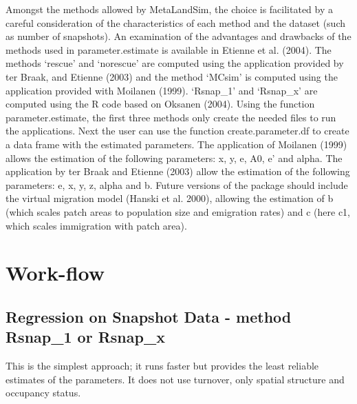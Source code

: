 \documentclass{article}\usepackage[]{graphicx}\usepackage[]{xcolor}
\begin{document}
Amongst the methods allowed by MetaLandSim, the choice is facilitated by a careful consideration of the characteristics of each method and the dataset (such as number of snapshots). An examination of the advantages and drawbacks of the methods used in parameter.estimate is available in Etienne et al. (2004). 
The methods `rescue' and `norescue'  are computed using the application provided by ter Braak, and Etienne (2003) and the method `MCsim' is computed using the application provided with Moilanen (1999). `Rsnap\_1' and `Rsnap\_x' are computed using the R code based on Oksanen (2004). Using the function parameter.estimate, the first three methods only create the needed files to run the applications. Next the user can use the function create.parameter.df to create a data frame with the estimated parameters.  
The application of Moilanen (1999) allows the estimation of the following parameters: x, y, e, A0, e' and alpha. The application by ter Braak and Etienne (2003) allow the estimation of the following parameters: e, x, y, z, alpha and b.
Future versions of the package should include the virtual migration model (Hanski et al. 2000), allowing the estimation of b (which scales patch areas to population size and emigration rates) and c (here c1, which scales immigration with patch area). \\


\section{Work-flow}

\subsection{Regression on Snapshot Data - method Rsnap\_1 or Rsnap\_x}

This is the simplest approach; it runs faster but provides the least reliable estimates of the parameters. It does not use turnover, only spatial structure and occupancy status.
\end{document}
